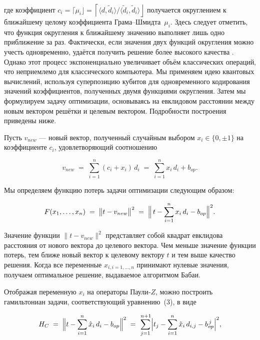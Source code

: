 \noindent где коэффициент $c_i=\lceil\mu_i\rfloor=
\left\lceil\langle{d},\widetilde{d}_i\rangle/
\langle\widetilde{d}_i,\widetilde{d}_i\rangle\right\rfloor$ получается
округлением к ближайшему целому коэффициента Грама–Шмидта~$\mu_i$. Здесь
следует отметить, что функция округления к ближайшему значению выполняет лишь
одно приближение за раз. Фактически, если значения двух функций округления
можно учесть одновременно, удаётся получить решение более высокого качества
\cite{cite_31}. Однако этот процесс экспоненциально увеличивает объём
классических операций, что неприемлемо для классического компьютера. Мы
применяем идею квантовых вычислений, используя суперпозицию кубитов для
одновременного кодирования значений коэффициентов, полученных двумя функциями
округления. Затем мы формулируем задачу оптимизации, основываясь на евклидовом
расстоянии между новым вектором решётки и целевым вектором. Подробности
построения приведены ниже.

Пусть $v_{new}$ — новый вектор, полученный случайным выбором $x_i\in\{0,\pm1\}$
на коэффициенте $c_i$, удовлетворяющий соотношению

\begin{equation}
    v_{new}
    \;=\;
    \sum_{i=1}^{n} (c_i + x_i)\,d_i
    \;=\;
    \sum_{i=1}^{n} x_i\,d_i + b_{op}.
\end{equation}

Мы определяем функцию потерь задачи оптимизации следующим образом:

\begin{equation}
    F(x_{1},\ldots,x_{n})
    \;=\;
    \bigl\lVert t - v_{new} \bigr\rVert^{2}
    \;=\;
    \Bigl\lVert\,
        t - \sum_{i=1}^{n} x_i\,d_i - b_{op}
    \Bigr\rVert^{2}.
\end{equation}

Значение функции $\lVert t-v_{new}\rVert^{2}$ представляет собой квадрат
евклидова расстояния от нового вектора до целевого вектора. Чем меньше значение
функции потерь, тем ближе новый вектор к целевому вектору $t$ и тем выше
качество решения. Когда все переменные $x_{i,i=1,\ldots,n}$ принимают нулевые
значения, получаем оптимальное решение, выдаваемое алгоритмом Бабаи.

Отображая переменную $x_i$ на операторы Паули‑$Z$, можно построить гамильтониан
задачи, соответствующий уравнению (3), в виде

\begin{equation}
    H_{C}
    \;=\;
    \Bigl\lVert
        t - \sum_{i=1}^{n} \hat{x}_{i}\,d_{i} - b_{op}
    \Bigr\rVert^{2}
    \;=\;
    \sum_{j=1}^{\,n+1}
    \Bigl|
    t_{j}
    - \sum_{i=1}^{n} \hat{x}_{i}\,d_{i,j}
    - b_{op}^{\,j}
    \Bigr|^{2},
\end{equation}

